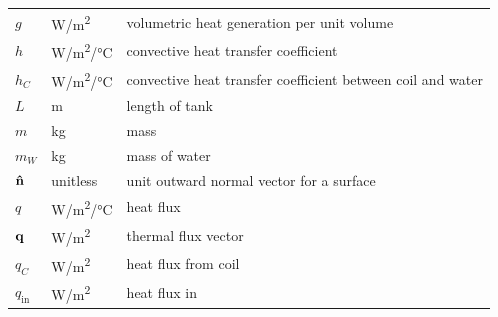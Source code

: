 \documentclass[12pt]{article}
\begin{document}
\begin{longtable*}{l l p{12cm}}
  $g$ & \si[per-mode=symbol] {\watt \per \square \metre} & volumetric heat
  generation per unit volume
  \\
  $h$ & \si[per-mode=symbol] {\watt\per\square\metre\per\celsius} & convective 
  heat transfer coefficient
  \\ 
  $h_C$ & \si[per-mode=symbol] {\watt\per \square \meter\per \celsius} &
  convective heat transfer coefficient between coil and water
  \\
  $L$ & \si{\metre} & length of tank
  \\
  $m$ & \si[per-mode=symbol] {\kilo\gram} & mass
  \\
  $m_W$ & \si[per-mode=symbol] {\kilo\gram} & mass of water
  \\
  $\bf{\hat{n}}$ & \si[per-mode=symbol] {unitless} & unit outward normal 
  vector for a surface 
  \\ 
  $q$ & \si[per-mode=symbol] {\watt \per \square \metre \per \celsius} & heat
  flux
  \\
  $\bf{q}$ & \si[per-mode=symbol] {\watt\per\square\metre} & thermal flux vector
  \\
  $q_C$ & \si[per-mode=symbol] {\watt\per\square\metre} & heat flux from coil
  \\
  $q_\text{in}$ & \si[per-mode=symbol] {\watt\per\square\metre} & heat flux in
  \\ 

\end{longtable*}
\end{document}

